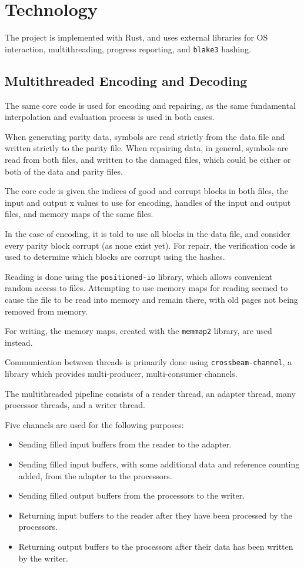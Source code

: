 \chapter{Technology}

The project is implemented with Rust, and uses external libraries for OS interaction, multithreading, progress reporting, and \texttt{blake3} hashing.

\section{Multithreaded Encoding and Decoding}

The same core code is used for encoding and repairing, as the same fundamental interpolation and evaluation process is used in both cases.

When generating parity data, symbols are read strictly from the data file and written strictly to the parity file.
When repairing data, in general, symbols are read from both files, and written to the damaged files, which could be either or both of the data and parity files.

The core code is given the indices of good and corrupt blocks in both files, the input and output x values to use for encoding,
handles of the input and output files, and memory maps of the same files.

In the case of encoding, it is told to use all blocks in the data file, and consider every parity block corrupt (as none exist yet).
For repair, the verification code is used to determine which blocks are corrupt using the hashes.

Reading is done using the \texttt{positioned-io} library, which allows convenient random access to files.
Attempting to use memory maps for reading seemed to cause the file to be read into memory and remain there, with old pages not being removed from memory.

For writing, the memory maps, created with the \texttt{memmap2} library, are used instead.

Communication between threads is primarily done using \texttt{crossbeam-channel}, a library which provides multi-producer, multi-consumer channels.

The multithreaded pipeline consists of a reader thread, an adapter thread, many processor threads, and a writer thread.

Five channels are used for the following purposes:
\begin{itemize}
    \item Sending filled input buffers from the reader to the adapter.
    \item Sending filled input buffers, with some additional data and reference counting added, from the adapter to the processors.
    \item Sending filled output buffers from the processors to the writer.
    \item Returning input buffers to the reader after they have been processed by the processors.
    \item Returning output buffers to the processors after their data has been written by the writer.
\end{itemize}

